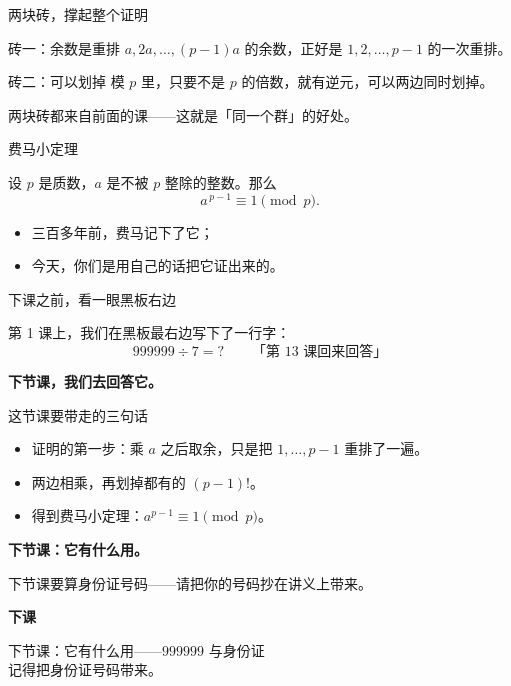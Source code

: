 \documentclass[10pt]{beamer}
\begin{document}
\begin{frame}{两块砖，撑起整个证明}
  \begin{block}{砖一：余数是重排}
    \(a,2a,\dots,(p-1)a\) 的余数，正好是 \(1,2,\dots,p-1\) 的一次重排。
  \end{block}
  \pause
  \begin{block}{砖二：可以划掉}
    模 \(p\) 里，只要不是 \(p\) 的倍数，就有逆元，可以两边同时划掉。
  \end{block}
  \pause
  \begin{center}
    {\large 两块砖都来自前面的课——这就是「同一个群」的好处。}
  \end{center}
\end{frame}

\begin{frame}{费马小定理}
  \begin{theorem}[费马小定理]
    设 \(p\) 是质数，\(a\) 是不被 \(p\) 整除的整数。那么
    \[
      a^{\,p-1}\equiv1 \pmod p .
    \]
  \end{theorem}
  \pause
  \begin{itemize}
    \item 三百多年前，费马记下了它；
    \item 今天，你们是用自己的话把它证出来的。
  \end{itemize}
\end{frame}

\begin{frame}{下课之前，看一眼黑板右边}
  \begin{center}
    {\large 第 1 课上，我们在黑板最右边写下了一行字：}
    \[
      999999\div7=?\qquad\text{「第 13 课回来回答」}
    \]
  \end{center}
  \pause
  \begin{center}
    {\Large\textcolor{textgreen}{\bfseries 下节课，我们去回答它。}}
  \end{center}
\end{frame}

\begin{frame}{这节课要带走的三句话}
  \begin{itemize}
    \item 证明的第一步：乘 \(a\) 之后取余，只是把 \(1,\dots,p-1\) 重排了一遍。
    \item 两边相乘，再划掉都有的 \((p-1)!\)。
    \item 得到费马小定理：\(a^{p-1}\equiv1\pmod p\)。
  \end{itemize}
  \pause
  \begin{center}
    {\large\textcolor{textgreen}{\bfseries 下节课：它有什么用。}}
  \end{center}
  \pause
  \begin{center}
    {\large 下节课要算身份证号码——请把你的号码抄在讲义上带来。}
  \end{center}
\end{frame}

\begin{frame}
  \begin{center}
    \vspace{1.6cm}
    {\Large\textcolor{textgreen}{\bfseries 下课}}

    \vspace{1.0cm}
    {\large\textcolor{accentgreen}{下节课：它有什么用——\(999999\) 与身份证}}\\[6pt]
    {\large 记得把身份证号码带来。}
  \end{center}
\end{frame}
\end{document}
